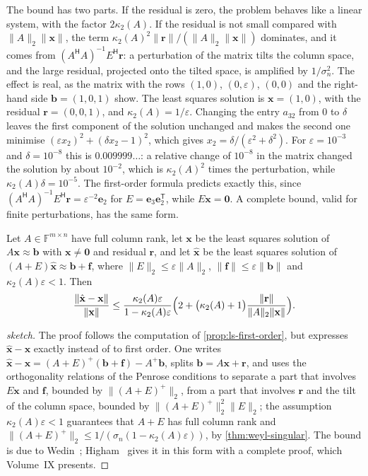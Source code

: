 The bound has two parts. If the residual is zero, the problem behaves like a linear system, with the factor $2\kappa_2(A)$. If the residual is not small compared with $\|A\|_2\|\mathbf x\|$, the term $\kappa_2(A)^2\|\mathbf r\|/(\|A\|_2\|\mathbf x\|)$ dominates, and it comes from $(A^{\mathsf H}A)^{-1}E^{\mathsf H}\mathbf r$: a perturbation of the matrix tilts the column space, and the large residual, projected onto the tilted space, is amplified by $1/\sigma_n^2$. The effect is real, as the matrix with the rows $(1,0)$, $(0,\varepsilon)$, $(0,0)$ and the right-hand side $\mathbf b=(1,0,1)$ show. The least squares solution is $\mathbf x=(1,0)$, with the residual $\mathbf r=(0,0,1)$, and $\kappa_2(A)=1/\varepsilon$. Changing the entry $a_{32}$ from $0$ to $\delta$ leaves the first component of the solution unchanged and makes the second one minimise $(\varepsilon x_2)^2+(\delta x_2-1)^2$, which gives $x_2=\delta/(\varepsilon^2+\delta^2)$. For $\varepsilon=10^{-3}$ and $\delta=10^{-8}$ this is $0.009999\ldots$: a relative change of $10^{-8}$ in the matrix changed the solution by about $10^{-2}$, which is $\kappa_2(A)^2$ times the perturbation, while $\kappa_2(A)\delta=10^{-5}$. The first-order formula predicts exactly this, since $(A^{\mathsf H}A)^{-1}E^{\mathsf H}\mathbf r=\varepsilon^{-2}\mathbf e_2$ for $E=\mathbf e_3\mathbf e_2^{\mathsf T}$, while $E\mathbf x=\mathbf 0$. A complete bound, valid for finite perturbations, has the same form.

\begin{theorem}
\label{thm:ls-sensitivity}
Let $A\in\mathbb F^{m\times n}$ have full column rank, let $\mathbf x$ be the least squares solution of $A\mathbf x\approx\mathbf b$ with $\mathbf x\ne\mathbf 0$ and residual $\mathbf r$, and let $\hat{\mathbf x}$ be the least squares solution of $(A+E)\hat{\mathbf x}\approx\mathbf b+\mathbf f$, where $\|E\|_2\le\varepsilon\|A\|_2$, $\|\mathbf f\|\le\varepsilon\|\mathbf b\|$ and $\kappa_2(A)\varepsilon<1$. Then
\[
\frac{\|\hat{\mathbf x}-\mathbf x\|}{\|\mathbf x\|}\le\frac{\kappa_2(A)\varepsilon}{1-\kappa_2(A)\varepsilon}\Bigl(2+\bigl(\kappa_2(A)+1\bigr)\frac{\|\mathbf r\|}{\|A\|_2\|\mathbf x\|}\Bigr).
\]
\end{theorem}

\begin{proof}[sketch]
The proof follows the computation of \cref{prop:ls-first-order}, but expresses $\hat{\mathbf x}-\mathbf x$ exactly instead of to first order. One writes $\hat{\mathbf x}-\mathbf x=(A+E)^+(\mathbf b+\mathbf f)-A^+\mathbf b$, splits $\mathbf b=A\mathbf x+\mathbf r$, and uses the orthogonality relations of the Penrose conditions to separate a part that involves $E\mathbf x$ and $\mathbf f$, bounded by $\|(A+E)^+\|_2$, from a part that involves $\mathbf r$ and the tilt of the column space, bounded by $\|(A+E)^+\|_2^2\|E\|_2$; the assumption $\kappa_2(A)\varepsilon<1$ guarantees that $A+E$ has full column rank and $\|(A+E)^+\|_2\le1/(\sigma_n(1-\kappa_2(A)\varepsilon))$, by \cref{thm:weyl-singular}. The bound is due to Wedin~\cite{wedin1973}; Higham~\cite[Thm.~20.1]{higham2002accuracy} gives it in this form with a complete proof, which Volume~IX presents.
\end{proof}

